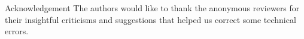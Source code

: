 \documentclass[journal]{IEEEtran}
\begin{document}
\begin{appendix}
\end{appendix}

\begin{section}{Acknowledgement}
	The authors would like to thank the anonymous reviewers for their insightful criticisms and suggestions that helped us correct some technical errors.
\end{section}



\end{document}
